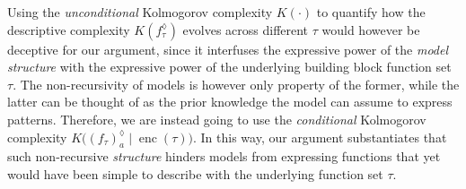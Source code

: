 Using the \textit{unconditional} Kolmogorov complexity $K(\cdot)$ to quantify how the descriptive complexity $K\left(f_{\tau}^{\lozenge}\right)$ evolves across different $\tau$ would however be deceptive for our argument, since it interfuses the expressive power of the \textit{model structure} with the expressive power of the underlying building block function set $\tau$.
The non-recursivity of models is however only property of the former, while the latter can be thought of as the prior knowledge the model can assume to express patterns.
Therefore, we are instead going to use the \textit{conditional} Kolmogorov complexity $K\bigl(\left(f_{\tau}\right)_{a}^{\lozenge}\mid \operatorname{enc}(\tau)\bigr)$.
In this way, our argument substantiates that such non-recursive \textit{structure} hinders models from expressing functions that yet would have been simple to describe with the underlying function set $\tau$.


